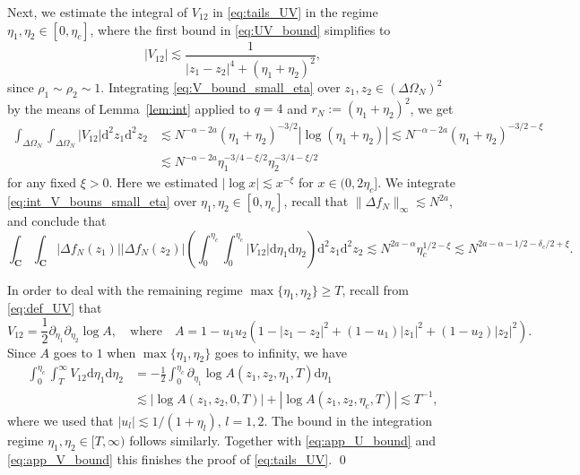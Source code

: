\documentclass[10pt]{amsart}
\numberwithin{equation}{section}
\newcommand{\dif}{\mathrm{d}}
\newcommand{\C}{\mathbf{C}}
\begin{document}
Next, we estimate the integral of $V_{12}$ in \eqref{eq:tails_UV} in the regime $\eta_1,\eta_2\in [0,\eta_c]$, where the first bound in \eqref{eq:UV_bound} simplifies to
\begin{equation}
|V_{12}|\lesssim \frac{1}{|z_1-z_2|^4 + (\eta_1+\eta_2)^2},
\label{eq:V_bound_small_eta}
\end{equation}
since $\rho_1\sim\rho_2\sim 1$. Integrating \eqref{eq:V_bound_small_eta} over $z_1,z_2\in (\Delta \Omega_N)^2$ by the means of Lemma~\ref{lem:int} applied to $q=4$ and $r_N:=(\eta_1+\eta_2)^2$, we get
\begin{equation}
\begin{split}
\int_{\Delta \Omega_N}\int_{\Delta \Omega_N} |V_{12}|\dif^2 z_1\dif^2 z_2 &\lesssim N^{-\alpha-2a}(\eta_1+\eta_2)^{-3/2} |\log (\eta_1+\eta_2)|\lesssim N^{-\alpha-2a}(\eta_1+\eta_2)^{-3/2-\xi}\\
&\lesssim N^{-\alpha-2a} \eta^{-3/4-\xi/2}_1\eta^{-3/4-\xi/2}_2
\end{split}
\label{eq:int_V_bouns_small_eta}
\end{equation}
for any fixed $\xi>0$. Here we estimated $|\log x|\lesssim x^{-\xi}$ for $x\in (0,2\eta_c]$. We integrate \eqref{eq:int_V_bouns_small_eta} over $\eta_1,\eta_2\in [0,\eta_c]$, recall that $\|\Delta f_N\|_\infty\lesssim N^{2a}$, and conclude that 
\begin{equation}
\int_{\C}\!\int_{\C}\! |\Delta f_N(z_1)||\Delta f_N(z_2)|\!\left(\int_0^{\eta_c}\!\!\!\int_0^{\eta_c}\!|V_{12}|\dif\eta_1\dif\eta_2\right) \dif^2 z_1\dif^2 z_2\lesssim N^{2a-\alpha}\eta_c^{1/2-\xi}\lesssim N^{2a-\alpha -1/2-\delta_c/2+\xi}.
\label{eq:app_V_bound}
\end{equation}

In order to deal with the remaining regime $\max\{\eta_1,\eta_2\}\ge T$, recall from \eqref{eq:def_UV} that
\begin{equation*}
V_{12}=\frac{1}{2}\partial_{\eta_1}\partial_{\eta_2} \log A,\quad \text{where}\quad A=1-u_1u_2\left( 1-|z_1-z_2|^2 + (1-u_1) |z_1|^2 + (1-u_2)|z_2|^2\right).
\end{equation*}
Since $A$ goes to $1$ when $\max\{\eta_1,\eta_2\}$ goes to infinity, we have
\begin{equation*}
\begin{split}
\int_0^{\eta_c}\int_T^\infty V_{12}\dif\eta_1\dif\eta_2  &= - \frac{1}{2}\int_0^{\eta_c} \partial_{\eta_1} \log A(z_1,z_2,\eta_1,T)\dif\eta_1\\
&\lesssim \left\vert \log A(z_1,z_2,0,T)\right\vert + \left\vert \log A(z_1,z_2,\eta_c,T)\right\vert\lesssim T^{-1},
\end{split} 
\end{equation*}
where we used that $|u_l|\lesssim 1/(1+\eta_l)$, $l=1,2$. The bound in the integration regime $\eta_1,\eta_2\in [T,\infty)$ follows similarly. Together with \eqref{eq:app_U_bound} and \eqref{eq:app_V_bound} this finishes the proof of \eqref{eq:tails_UV}. \qed
\end{document}

